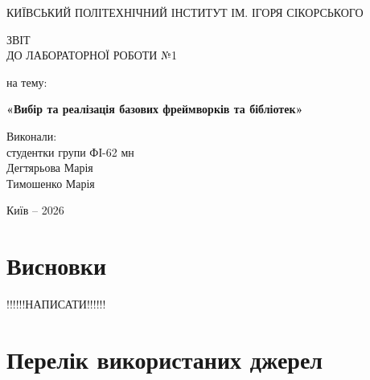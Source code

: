 \documentclass[12pt,a4paper]{article}
\begin{document}
\begin{titlepage}

\begin{center}

КИЇВСЬКИЙ ПОЛІТЕХНІЧНИЙ ІНСТИТУТ
ІМ. ІГОРЯ СІКОРСЬКОГО

\vspace{2cm}

{\large ЗВІТ}\\
{\large ДО ЛАБОРАТОРНОЇ РОБОТИ №1}

\vspace{1cm}

{\large на тему:}

\vspace{0.5cm}

\textbf{«Вибір та реалізація базових фреймворків та бібліотек»}

\end{center}

\vfill

\begin{flushright}
\begin{minipage}{0.4\textwidth}

Виконали:\\
студентки групи ФІ-62 мн\\
Дегтярьова Марія\\
Тимошенко Марія

\end{minipage}
\end{flushright}

\vfill

\begin{center}
Київ -- 2026
\end{center}

\end{titlepage}

\tableofcontents
\newpage








\section*{Висновки}
!!!!!!НАПИСАТИ!!!!!!



\section*{Перелік використаних джерел}
\end{document}
